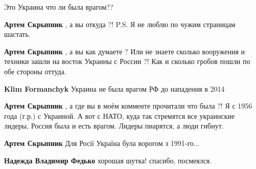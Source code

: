 \begin{itemize}
\begin{itemize}
\begin{itemize}
\end{itemize} %

Это Украина что ли была врагом??

\begin{itemize} %
\textbf{Артем Скрыпник} , а вы откуда ?! P.S. Я не люблю по чужим страницам шастать.

\textbf{Артем Скрыпник} , а вы как думаете ? Или не знаете сколько вооружения и техники зашли на восток Украины с России ?! Как и сколько гробов пошли по обе стороны оттуда.

\textbf{Klim Formanchyk} Украина не была врагом РФ до нападения в 2014

\textbf{Артем Скрыпник} , а где вы в моём комменте прочитали что была ?! Я с 1956 года (г.р.) с Украиной. А вот с НАТО, куда так стремятся все украинские лидеры, Россия была и есть врагом. Лидеры пиарятся, а люди гибнут.

\textbf{Артем Скрыпник} Для Росії Україна була ворогом з 1991-го...

\textbf{Надежда Владимир Федько} хорошая шутка! спасибо, посмеялся.
\end{itemize} %

\end{itemize} %


\end{itemize} %
